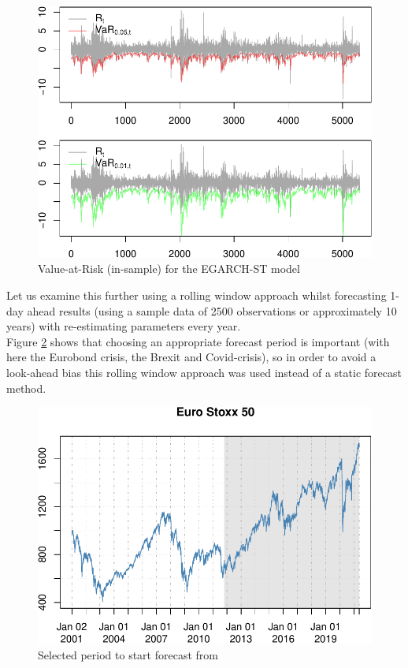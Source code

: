 \documentclass[a4paper, nobind]{templates/ociamthesis}
\begin{document}
\begin{figure}[h]

{\centering \includegraphics[width=0.6\linewidth]{_main_files/figure-latex/figVaRinsample-1} 

}

\caption{Value-at-Risk (in-sample) for the EGARCH-ST model}\label{fig:figVaRinsample}
\end{figure}

\noindent Let us examine this further using a rolling window approach whilst forecasting 1-day ahead results (using a sample data of 2500 observations or approximately 10 years) with re-estimating parameters every year.~\\

\noindent Figure \ref{fig:figbacktest} shows that choosing an appropriate forecast period is important (with here the Eurobond crisis, the Brexit and Covid-crisis), so in order to avoid a look-ahead bias this rolling window approach was used instead of a static forecast method. \newpage

\begin{figure}[h]

{\centering \includegraphics[width=0.7\linewidth]{_main_files/figure-latex/figbacktest-1} 

}

\caption{Selected period to start forecast from}\label{fig:figbacktest}
\end{figure}
\end{document}

